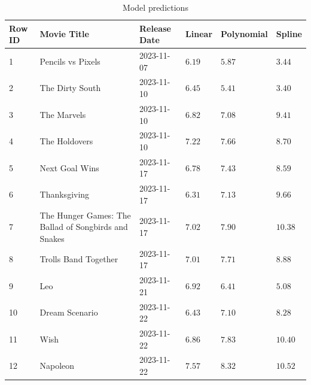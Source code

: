 \documentclass[12pt,a4paper]{article}
\begin{document}
\begin{appendices}
    \begin{table}[h]
        \centering
        \begin{tabular}{|l|p{6cm}|l|l|l|l|}
            \hline
            \textbf{Row ID} & \textbf{Movie Title}                                 & \textbf{Release Date} & \textbf{Linear} & \textbf{Polynomial} & \textbf{Spline} \\
            \hline
            1               & Pencils vs Pixels                                    & 2023-11-07            & $6.19$          & $5.87$              & $3.44$          \\
            2               & The Dirty South                                      & 2023-11-10            & $6.45$          & $5.41$              & $3.40$          \\
            3               & The Marvels                                          & 2023-11-10            & $6.82$          & $7.08$              & $9.41$          \\
            4               & The Holdovers                                        & 2023-11-10            & $7.22$          & $7.66$              & $8.70$          \\
            5               & Next Goal Wins                                       & 2023-11-17            & $6.78$          & $7.43$              & $8.59$          \\
            6               & Thanksgiving                                         & 2023-11-17            & $6.31$          & $7.13$              & $9.66$          \\
            7               & The Hunger Games: The Ballad of Songbirds and Snakes & 2023-11-17            & $7.02$          & $7.90$              & $10.38$         \\
            8               & Trolls Band Together                                 & 2023-11-17            & $7.01$          & $7.71$              & $8.88$          \\
            9               & Leo                                                  & 2023-11-21            & $6.92$          & $6.41$              & $5.08$          \\
            10              & Dream Scenario                                       & 2023-11-22            & $6.43$          & $7.10$              & $8.28$          \\
            11              & Wish                                                 & 2023-11-22            & $6.86$          & $7.83$              & $10.40$         \\
            12              & Napoleon                                             & 2023-11-22            & $7.57$          & $8.32$              & $10.52$         \\
            \hline
        \end{tabular}
        \caption{Model predictions}
        \label{tab:predictions}
    \end{table}


\end{appendices}
\end{document}
